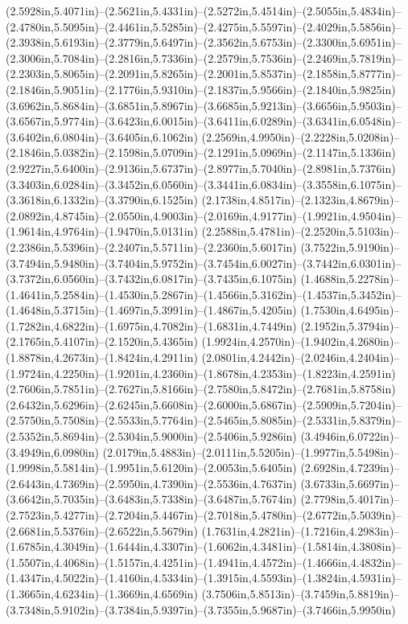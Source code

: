 (2.5928in,5.4071in)--(2.5621in,5.4331in)--(2.5272in,5.4514in)--(2.5055in,5.4834in)--(2.4780in,5.5095in)--(2.4461in,5.5285in)--(2.4275in,5.5597in)--(2.4029in,5.5856in)--(2.3938in,5.6193in)--(2.3779in,5.6497in)--(2.3562in,5.6753in)--(2.3300in,5.6951in)--(2.3006in,5.7084in)--(2.2816in,5.7336in)--(2.2579in,5.7536in)--(2.2469in,5.7819in)--(2.2303in,5.8065in)--(2.2091in,5.8265in)--(2.2001in,5.8537in)--(2.1858in,5.8777in)--(2.1846in,5.9051in)--(2.1776in,5.9310in)--(2.1837in,5.9566in)--(2.1840in,5.9825in) (3.6962in,5.8684in)--(3.6851in,5.8967in)--(3.6685in,5.9213in)--(3.6656in,5.9503in)--(3.6567in,5.9774in)--(3.6423in,6.0015in)--(3.6411in,6.0289in)--(3.6341in,6.0548in)--(3.6402in,6.0804in)--(3.6405in,6.1062in) (2.2569in,4.9950in)--(2.2228in,5.0208in)--(2.1846in,5.0382in)--(2.1598in,5.0709in)--(2.1291in,5.0969in)--(2.1147in,5.1336in) (2.9227in,5.6400in)--(2.9136in,5.6737in)--(2.8977in,5.7040in)--(2.8981in,5.7376in) (3.3403in,6.0284in)--(3.3452in,6.0560in)--(3.3441in,6.0834in)--(3.3558in,6.1075in)--(3.3618in,6.1332in)--(3.3790in,6.1525in) (2.1738in,4.8517in)--(2.1323in,4.8679in)--(2.0892in,4.8745in)--(2.0550in,4.9003in)--(2.0169in,4.9177in)--(1.9921in,4.9504in)--(1.9614in,4.9764in)--(1.9470in,5.0131in) (2.2588in,5.4781in)--(2.2520in,5.5103in)--(2.2386in,5.5396in)--(2.2407in,5.5711in)--(2.2360in,5.6017in) (3.7522in,5.9190in)--(3.7494in,5.9480in)--(3.7404in,5.9752in)--(3.7454in,6.0027in)--(3.7442in,6.0301in)--(3.7372in,6.0560in)--(3.7432in,6.0817in)--(3.7435in,6.1075in) (1.4688in,5.2278in)--(1.4641in,5.2584in)--(1.4530in,5.2867in)--(1.4566in,5.3162in)--(1.4537in,5.3452in)--(1.4648in,5.3715in)--(1.4697in,5.3991in)--(1.4867in,5.4205in) (1.7530in,4.6495in)--(1.7282in,4.6822in)--(1.6975in,4.7082in)--(1.6831in,4.7449in) (2.1952in,5.3794in)--(2.1765in,5.4107in)--(2.1520in,5.4365in) (1.9924in,4.2570in)--(1.9402in,4.2680in)--(1.8878in,4.2673in)--(1.8424in,4.2911in) (2.0801in,4.2442in)--(2.0246in,4.2404in)--(1.9724in,4.2250in)--(1.9201in,4.2360in)--(1.8678in,4.2353in)--(1.8223in,4.2591in) (2.7606in,5.7851in)--(2.7627in,5.8166in)--(2.7580in,5.8472in)--(2.7681in,5.8758in) (2.6432in,5.6296in)--(2.6245in,5.6608in)--(2.6000in,5.6867in)--(2.5909in,5.7204in)--(2.5750in,5.7508in)--(2.5533in,5.7764in)--(2.5465in,5.8085in)--(2.5331in,5.8379in)--(2.5352in,5.8694in)--(2.5304in,5.9000in)--(2.5406in,5.9286in) (3.4946in,6.0722in)--(3.4949in,6.0980in) (2.0179in,5.4883in)--(2.0111in,5.5205in)--(1.9977in,5.5498in)--(1.9998in,5.5814in)--(1.9951in,5.6120in)--(2.0053in,5.6405in) (2.6928in,4.7239in)--(2.6443in,4.7369in)--(2.5950in,4.7390in)--(2.5536in,4.7637in) (3.6733in,5.6697in)--(3.6642in,5.7035in)--(3.6483in,5.7338in)--(3.6487in,5.7674in) (2.7798in,5.4017in)--(2.7523in,5.4277in)--(2.7204in,5.4467in)--(2.7018in,5.4780in)--(2.6772in,5.5039in)--(2.6681in,5.5376in)--(2.6522in,5.5679in) (1.7631in,4.2821in)--(1.7216in,4.2983in)--(1.6785in,4.3049in)--(1.6444in,4.3307in)--(1.6062in,4.3481in)--(1.5814in,4.3808in)--(1.5507in,4.4068in)--(1.5157in,4.4251in)--(1.4941in,4.4572in)--(1.4666in,4.4832in)--(1.4347in,4.5022in)--(1.4160in,4.5334in)--(1.3915in,4.5593in)--(1.3824in,4.5931in)--(1.3665in,4.6234in)--(1.3669in,4.6569in) (3.7506in,5.8513in)--(3.7459in,5.8819in)--(3.7348in,5.9102in)--(3.7384in,5.9397in)--(3.7355in,5.9687in)--(3.7466in,5.9950in) 